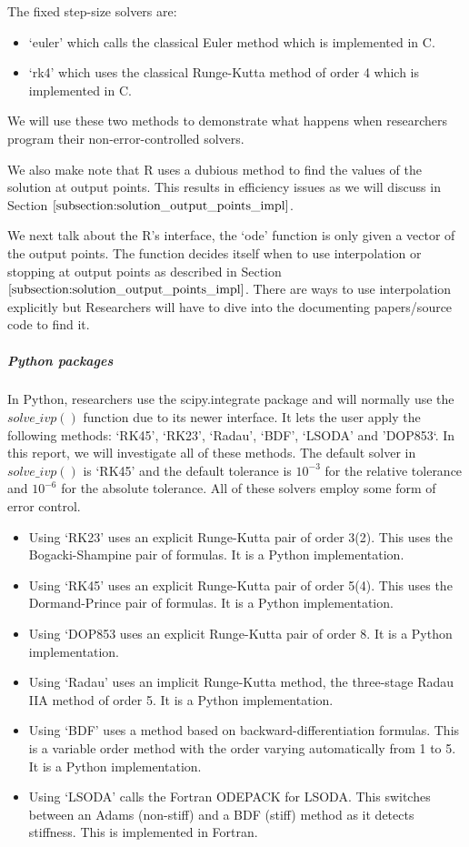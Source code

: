 The fixed step-size solvers are:
\begin{itemize}
\item `euler' which calls the classical Euler method which is implemented in C.
\item `rk4' which uses the classical Runge-Kutta method of order 4 which is implemented in C. 
\end{itemize}

We will use these two methods to demonstrate what happens when researchers program their non-error-controlled solvers.

We also make note that R uses a dubious method to find the values of the solution at output points. This results in efficiency issues as we will discuss in Section $\ref{subsection:solution_output_points_impl}$. 

We next talk about the R's interface, the `ode' function is only given a vector of the output points. The function decides itself when to use interpolation or stopping at output points as described in Section $\ref{subsection:solution_output_points_impl}$. There are ways to use interpolation explicitly but Researchers will have to dive into the documenting papers/source code to find it. 

\subparagraph{Python packages}
In Python, researchers use the scipy.integrate package and will normally use the $solve\_ivp()$ function due to its newer interface. It lets the user apply the following methods: `RK45', `RK23', `Radau', `BDF', `LSODA' and 'DOP853`. In this report, we will investigate all of these methods. The default solver in $solve\_ivp()$ is `RK45' and the default tolerance is $10^{-3}$ for the relative tolerance and $10^{-6}$ for the absolute tolerance. All of these solvers employ some form of error control. 

\begin{itemize}
\item Using `RK23' uses an explicit Runge-Kutta pair of order 3(2). This uses the Bogacki-Shampine pair of formulas. It is a Python implementation.
\item Using `RK45' uses an explicit Runge-Kutta pair of order 5(4). This uses the Dormand-Prince pair of formulas. It is a Python implementation.
\item Using `DOP853 uses an explicit Runge-Kutta pair of order 8. It is a Python implementation.
\item Using `Radau' uses an implicit Runge-Kutta method, the three-stage Radau IIA method of order 5. It is a Python implementation.
\item Using `BDF' uses a method based on backward-differentiation formulas. This is a variable order method with the order varying automatically from 1 to 5. It is a Python implementation.
\item Using `LSODA' calls the Fortran ODEPACK for LSODA. This switches between an Adams (non-stiff) and a BDF (stiff) method as it detects stiffness. This is implemented in Fortran.
\end{itemize}

